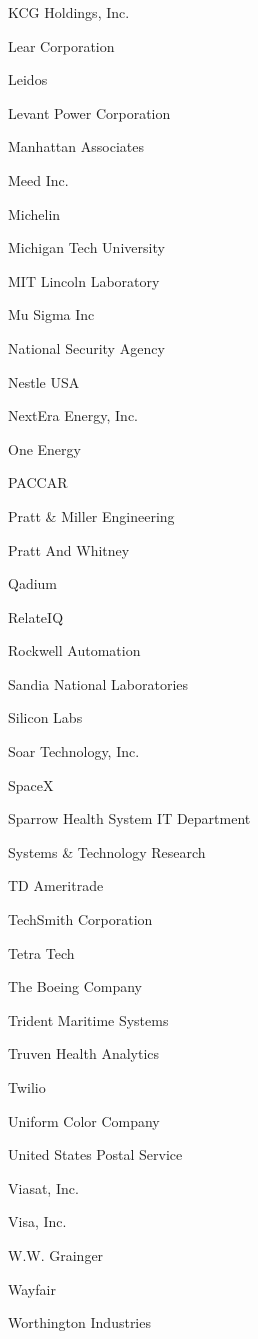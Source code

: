 \documentclass[twoside]{article}
\begin{document}
\begin{center}
\begin{multicols}{5}
\begin{FlushLeft}
\begin{compactitem}
\item KCG Holdings, Inc.
\item Lear Corporation
\item Leidos
\item Levant Power Corporation
\item Manhattan Associates
\item Meed Inc.
\item Michelin
\item Michigan Tech University
\item MIT Lincoln Laboratory
\item Mu Sigma Inc
\item National Security Agency
\item Nestle USA
\item NextEra Energy, Inc.
\item One Energy
\item PACCAR
\item Pratt \& Miller Engineering
\item Pratt And Whitney
\item Qadium
\item RelateIQ
\item Rockwell Automation
\item Sandia National Laboratories
\item Silicon Labs
\item Soar Technology, Inc.
\item SpaceX
\item Sparrow Health System IT Department
\item Systems \& Technology Research
\item TD Ameritrade
\item TechSmith Corporation
\item Tetra Tech
\item The Boeing Company
\item Trident Maritime Systems
\item Truven Health Analytics
\item Twilio
\item Uniform Color Company
\item United States Postal Service
\item Viasat, Inc.
\item Visa, Inc.
\item W.W. Grainger
\item Wayfair
\item Worthington Industries
\end{compactitem}

\end{FlushLeft}
\end{multicols}
\end{center}
\end{document}

